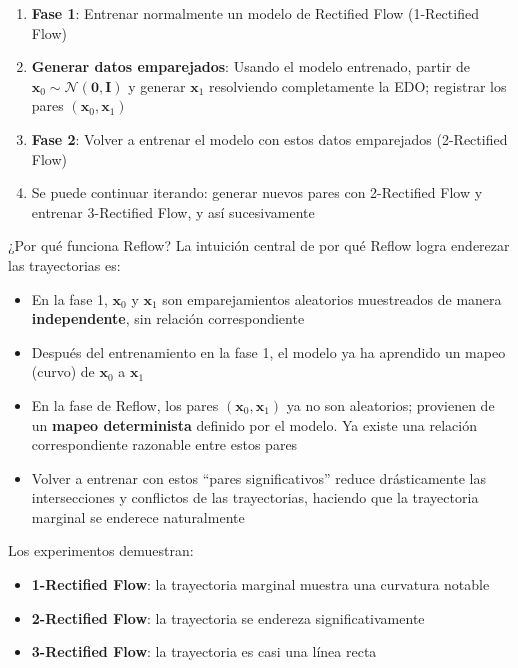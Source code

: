 \begin{enumerate}
    \item \textbf{Fase 1}: Entrenar normalmente un modelo de Rectified Flow (1-Rectified Flow)
    \item \textbf{Generar datos emparejados}: Usando el modelo entrenado, partir de $\mathbf{x}_0 \sim \mathcal{N}(\mathbf{0}, \mathbf{I})$ y generar $\mathbf{x}_1$ resolviendo completamente la EDO; registrar los pares $(\mathbf{x}_0, \mathbf{x}_1)$
    \item \textbf{Fase 2}: Volver a entrenar el modelo con estos datos emparejados (2-Rectified Flow)
    \item Se puede continuar iterando: generar nuevos pares con 2-Rectified Flow y entrenar 3-Rectified Flow, y así sucesivamente
\end{enumerate}

\begin{importantbox}{¿Por qué funciona Reflow?}
La intuición central de por qué Reflow logra enderezar las trayectorias es:
\begin{itemize}
    \item En la fase 1, $\mathbf{x}_0$ y $\mathbf{x}_1$ son emparejamientos aleatorios muestreados de manera \textbf{independente}, sin relación correspondiente
    \item Después del entrenamiento en la fase 1, el modelo ya ha aprendido un mapeo (curvo) de $\mathbf{x}_0$ a $\mathbf{x}_1$
    \item En la fase de Reflow, los pares $(\mathbf{x}_0, \mathbf{x}_1)$ ya no son aleatorios; provienen de un \textbf{mapeo determinista} definido por el modelo. Ya existe una relación correspondiente razonable entre estos pares
    \item Volver a entrenar con estos ``pares significativos'' reduce drásticamente las intersecciones y conflictos de las trayectorias, haciendo que la trayectoria marginal se enderece naturalmente
\end{itemize}
\end{importantbox}

Los experimentos demuestran:
\begin{itemize}
    \item \textbf{1-Rectified Flow}: la trayectoria marginal muestra una curvatura notable
    \item \textbf{2-Rectified Flow}: la trayectoria se endereza significativamente
    \item \textbf{3-Rectified Flow}: la trayectoria es casi una línea recta
\end{itemize}

